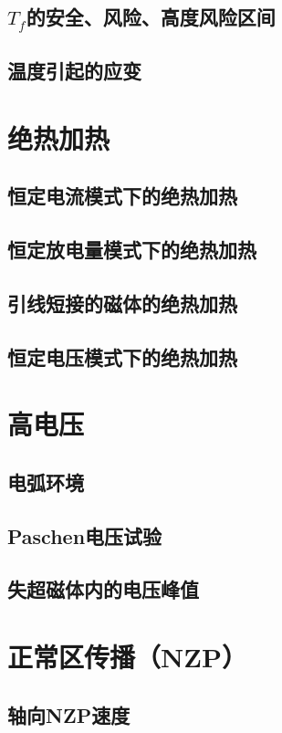 \subsection{$T_f$的安全、风险、高度风险区间}

\subsection{温度引起的应变}


\section{绝热加热}
\subsection{恒定电流模式下的绝热加热}
\subsection{恒定放电量模式下的绝热加热}
\subsection{引线短接的磁体的绝热加热}
\subsection{恒定电压模式下的绝热加热}

\section{高电压}
\subsection{电弧环境}
\subsection{Paschen电压试验}
\subsection{失超磁体内的电压峰值}

\section{正常区传播（NZP）}

\subsection{轴向NZP速度}
